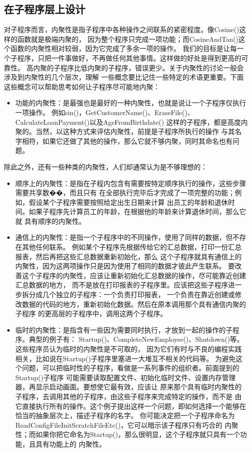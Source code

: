 \documentclass{article}
\begin{document}
\subsection{在子程序层上设计}
对子程序而言，内聚性是指子程序中各种操作之间联系的紧密程度。像Cosine()这样的函数就是极端内聚的，
因为整个程序只完成一项功能；而CosineAndTan()这个函数的内聚性相对较弱，因为它完成了多余一项的操作。
我们的目标是让每一个子程序，只把一件事做好，不再做任何其他事情。这样做的好处是得到更高的可靠性。
高内聚的子程序比低内聚的子程序，错误更少。关于内聚性的讨论一般会涉及到内聚性的几个层次，理解
一些概念要比记住一些特定的术语更重要。下面这些概念可以帮助思考如何让子程序尽可能地内聚：
\begin{itemize}
    \item 功能的内聚性：是最强也是最好的一种内聚性，也就是说让一个子程序仅执行一项操作。
    例如sin()，GetCustomerName()、EraseFile()、CalculateLoanPayment()以及AgeFromBirthdate()
    这样的子程序，都是高度内聚的。当然，以这种方式来评估内聚性，前提是子程序所执行的操作
    与其名字相符，如果它还做了其他的操作，那么它就不够内聚，同时其命名也有问题。
\end{itemize}
除此之外，还有一些种类的内聚性，人们却通常认为是不够理想的：
\begin{itemize}
    \item 顺序上的内聚性：是指在子程内包含有需要按特定顺序执行的操作，这些步骤需要共享数��，而且只有
    在全部执行完毕后才完成了一项完整的功能；例如，假设某个子程序需要按照给定出生日期来计算
    出员工的年龄和退休时间。如果子程序先计算员工的年龄，在根据他的年龄来计算退休时间，那么它就
    具有顺序的内聚性。
    \item 通信上的内聚性：是指一个子程序中的不同操作，使用了同样的数据，但不存在其他任何联系。
    例如某个子程序先根据传给它的汇总数据，打印一份汇总报表，然后再把这些汇总数据重新初始化，那么
    这个子程序就具有通信上的内聚性，因为这两项操作只是因为使用了相同的数据才彼此产生联系。
    要改善这个子程序的内聚性，应该让重新初始化汇总数据的操作，尽可能靠近创建汇总数据的地方，
    而不是放在打印报表的子程序里。应该把这些子程序进一步拆分成几个独立的子程序：一个负责打印报表，
    一个负责在靠近创建或修改数据的代码的地方，重新初始化数据。然后在原本调用那个具有通信内聚的子程序
    的更高层的子程序中，调用这两个子程序。
    \item 临时的内聚性：是指含有一些因为需要同时执行，才放到一起的操作的子程序。典型的例子有：
    Startup()、CompleteNewEmployee()、Shutdown()等。这些程序员认为临时的内聚性是不可取的，
    因为它们有时与不良的编程实践相关，比如说在Startup()子程序里塞进一大堆互不相关的代码等。
    为避免这个问题，可以把临时性的子程序，看做是一系列事件的组织者。前面提到的Startup()子程序
    可能需要读取配置文件、初始化临时文件、设置内存管理器，再显示启动画面。要想使它最有效，应该让
    原来那个具有临时内聚性的子程序，去调用其他的子程序，由这些子程序来完成特定的操作，而不是
    由它直接执行所有的操作。这个例子提出这样一个问题，即如何选择一个能够在恰当的抽象层次上，描述子程序的名字。
    你可能决定把一个子程序命名为ReadConfigFileInitScratchFileEtc()，它可以暗示该子程序只有巧合的
    内聚性；而如果你把它命名为Startup()，那么很明显，这个子程序就只具有一个功能，且具有功能上的
    内聚性。
\end{itemize}
\end{document}
